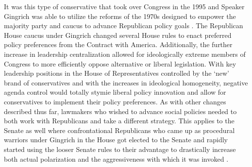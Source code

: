 \documentclass[12pt]{article}
\begin{document}
It was this type of conservative that took over Congress in the 1995 and Speaker Gingrich was able to utilize the reforms of the 1970s designed to empower the majority party and caucus to advance Republican policy goals \citep{roberts2003}. The Republican House caucus under Gingrich changed several House rules to enact preferred policy preferences from the Contract with America. Additionally, the further increase in leadership centralization allowed for ideologically extreme members of Congress to more efficiently oppose alternative or liberal legislation. With key leadership positions in the House of Representatives controlled by the `new' brand of conservatives and with the increases in ideological homogeneity, negative agenda control would totally stymie liberal policy innovation and allow for conservatives to implement their policy preferences. As with other changes described thus far, lawmakers who wished to advance social policies needed to both work with Republicans and take a different strategy. This applies to the Senate as well where confrontational Republicans who came up as procedural warriors under Gingrich in the House got elected to the Senate and rapidly started using the looser Senate rules to their advantage to drastically increase both actual polarization and the aggressiveness with which it was invoked \citep{lee2008, theriault2013}.
\end{document}

